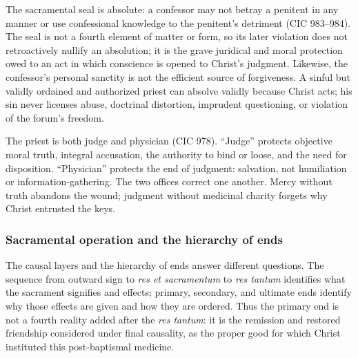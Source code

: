 The sacramental seal is absolute: a confessor may not betray a penitent in any manner or use confessional knowledge to the penitent's detriment (CIC 983--984). The seal is not a fourth element of matter or form, so its later violation does not retroactively nullify an absolution; it is the grave juridical and moral protection owed to an act in which conscience is opened to Christ's judgment. Likewise, the confessor's personal sanctity is not the efficient source of forgiveness. A sinful but validly ordained and authorized priest can absolve validly because Christ acts; his sin never licenses abuse, doctrinal distortion, imprudent questioning, or violation of the forum's freedom.

The priest is both judge and physician (CIC 978). ``Judge'' protects objective moral truth, integral accusation, the authority to bind or loose, and the need for disposition. ``Physician'' protects the end of judgment: salvation, not humiliation or information-gathering. The two offices correct one another. Mercy without truth abandons the wound; judgment without medicinal charity forgets why Christ entrusted the keys.

\subsubsection{Sacramental operation and the hierarchy of ends}

The causal layers and the hierarchy of ends answer different questions. The sequence from outward sign to \emph{res et sacramentum} to \emph{res tantum} identifies what the sacrament signifies and effects; primary, secondary, and ultimate ends identify why those effects are given and how they are ordered. Thus the primary end is not a fourth reality added after the \emph{res tantum}: it is the remission and restored friendship considered under final causality, as the proper good for which Christ instituted this post-baptismal medicine.

